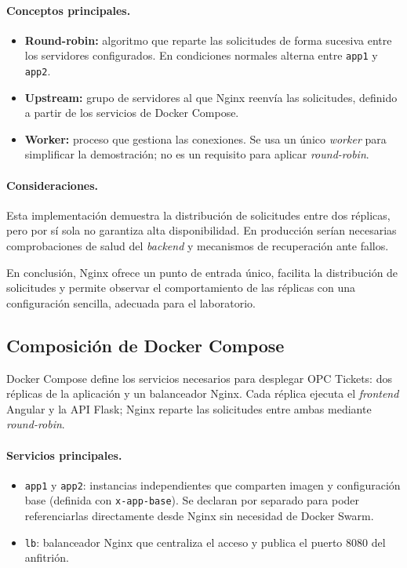 \documentclass[11pt,letterpaper]{article}
\newcommand{\f}[1]{\texttt{#1}}
\begin{document}
\paragraph{Conceptos principales.}
\begin{itemize}
  \item \textbf{Round-robin:} algoritmo que reparte las solicitudes de forma sucesiva entre los servidores configurados. En condiciones normales alterna entre \f{app1} y \f{app2}.
  \item \textbf{Upstream:} grupo de servidores al que Nginx reenvía las solicitudes, definido a partir de los servicios de Docker Compose.
  \item \textbf{Worker:} proceso que gestiona las conexiones. Se usa un único \textit{worker} para simplificar la demostración; no es un requisito para aplicar \textit{round-robin}.
\end{itemize}

\paragraph{Consideraciones.} Esta implementación demuestra la distribución de solicitudes entre dos réplicas, pero por sí sola no garantiza alta disponibilidad. En producción serían necesarias comprobaciones de salud del \textit{backend} y mecanismos de recuperación ante fallos.

En conclusión, Nginx ofrece un punto de entrada único, facilita la distribución de solicitudes y permite observar el comportamiento de las réplicas con una configuración sencilla, adecuada para el laboratorio.

\subsection{Composición de Docker Compose}

Docker Compose define los servicios necesarios para desplegar OPC Tickets: dos réplicas de la aplicación y un balanceador Nginx. Cada réplica ejecuta el \textit{frontend} Angular y la API Flask; Nginx reparte las solicitudes entre ambas mediante \textit{round-robin}.

\paragraph{Servicios principales.}
\begin{itemize}
  \item \f{app1} y \f{app2}: instancias independientes que comparten imagen y configuración base (definida con \f{x-app-base}). Se declaran por separado para poder referenciarlas directamente desde Nginx sin necesidad de Docker Swarm.
  \item \f{lb}: balanceador Nginx que centraliza el acceso y publica el puerto 8080 del anfitrión.
\end{itemize}
\end{document}
